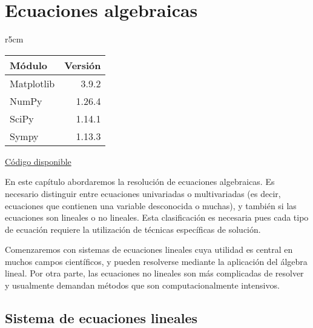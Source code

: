 

\chapter{Ecuaciones algebraicas} \label{ch:algebraicas}


\begin{wraptable}{r}{5cm}
\begin{modulesinfo}
\begin{center}
{\small
    \begin{tabular}{l r}
        \toprule
        \textbf{Módulo} & \textbf{Versión} \\
        \midrule
        Matplotlib & 3.9.2 \\
        NumPy & 1.26.4 \\
        SciPy & 1.14.1 \\
        Sympy & 1.13.3 \\
        \bottomrule
    \end{tabular}
    \vspace{0.75em}
    
    \href{https://github.com/facundobatista/libro-pyciencia/tree/master/código/ecuaciones_algebraicas/}{Código disponible}
}
\end{center}
\end{modulesinfo}
\end{wraptable}

En este capítulo abordaremos la resolución de ecuaciones algebraicas. Es necesario distinguir entre ecuaciones univariadas o multivariadas (es decir, ecuaciones que contienen una variable desconocida o muchas), y también si las ecuaciones son lineales o no lineales. Esta clasificación es necesaria pues cada tipo de ecuación requiere la utilización de técnicas específicas de solución.

Comenzaremos con sistemas de ecuaciones lineales cuya utilidad es central en muchos campos científicos, y pueden resolverse mediante la aplicación del álgebra lineal. Por otra parte, las ecuaciones no lineales son más complicadas de resolver y usualmente demandan métodos que son computacionalmente intensivos.


\section{Sistema de ecuaciones lineales}

